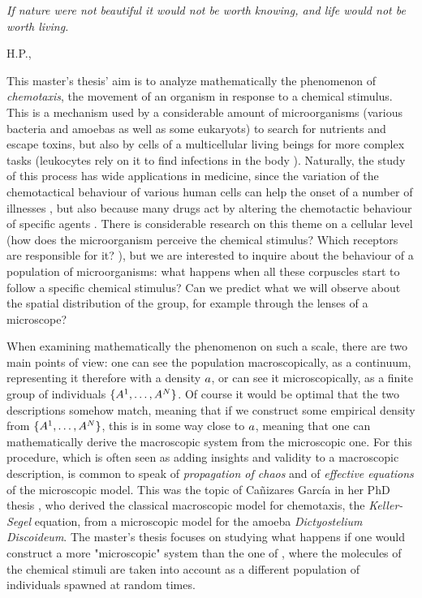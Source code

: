 \epigraph{
	\textit{
		If nature were not beautiful it would not be worth knowing, and life would not be worth living.
	}
}{
	H.P., \cite{science-and-hypothesis}
}


This master's thesis' aim is to analyze mathematically the phenomenon of \emph{chemotaxis}, \ie the movement of an organism in response to a chemical stimulus.
This is a mechanism used by a considerable amount of microorganisms (various bacteria and amoebas as well as some eukaryots) to search for nutrients and escape toxins, but also by cells of a multicellular living beings for more complex tasks (\eg leukocytes rely on it to find infections in the body \cite{chemotaxis-leukocytes}).
Naturally, the study of this process has wide applications in medicine, since the variation of the chemotactical behaviour of various human cells can help the onset of a number of illnesses \cite{ct-diseases}, but also because many drugs act by altering the chemotactic behaviour of specific agents \cite[Conclusions and perspectives]{cancer-medicine-chemotaxis}.
There is considerable research on this theme on a cellular level (how does the microorganism perceive the chemical stimulus? Which receptors are responsible for it? \cite{ct-chemical-mechanisms}), but we are interested to inquire about the behaviour of a population of microorganisms: what happens when all these corpuscles start to follow a specific chemical stimulus? Can we predict what we will observe about the spatial distribution of the group, for example through the lenses of a microscope? 


When examining mathematically the phenomenon on such a scale, there are two main points of view:
one can see the population macroscopically, as a continuum, representing it therefore with a density $a$, or can see it microscopically, \ie as a finite group of individuals $\{A^1, \ldots, A^N\}$.
Of course it would be optimal that the two descriptions somehow match, meaning that if we construct some empirical density from $\{A^1, \ldots, A^N\}$, this is in some way close to $a$, meaning that one can mathematically derive the macroscopic system from the microscopic one.
For this procedure, which is often seen as adding insights and validity to a macroscopic description, is common to speak of \emph{propagation of chaos} and of \emph{effective equations} of the microscopic model.
This was the topic of Cañizares García in her PhD thesis \cite{ana}, who derived the classical macroscopic model for chemotaxis, the \emph{Keller-Segel} equation, from a microscopic model for the amoeba \emph{Dictyostelium Discoideum}.
The master's thesis focuses on studying what happens if one would construct a more "microscopic" system than the one of \cite{ana}, where the molecules of the chemical stimuli are taken into account as a different population of individuals spawned at random times.


